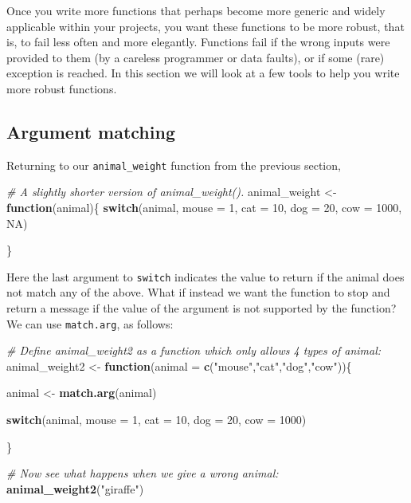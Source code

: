 \documentclass[]{book}
\newenvironment{Shaded}{\begin{snugshade}}{\end{snugshade}}
\newcommand{\CommentTok}[1]{\textcolor[rgb]{0.56,0.35,0.01}{\textit{#1}}}
\newcommand{\ControlFlowTok}[1]{\textcolor[rgb]{0.13,0.29,0.53}{\textbf{#1}}}
\newcommand{\DataTypeTok}[1]{\textcolor[rgb]{0.13,0.29,0.53}{#1}}
\newcommand{\DecValTok}[1]{\textcolor[rgb]{0.00,0.00,0.81}{#1}}
\newcommand{\KeywordTok}[1]{\textcolor[rgb]{0.13,0.29,0.53}{\textbf{#1}}}
\newcommand{\NormalTok}[1]{#1}
\newcommand{\OtherTok}[1]{\textcolor[rgb]{0.56,0.35,0.01}{#1}}
\newcommand{\StringTok}[1]{\textcolor[rgb]{0.31,0.60,0.02}{#1}}
\begin{document}
Once you write more functions that perhaps become more generic and widely applicable within your projects, you want these functions to be more robust, that is, to fail less often and more elegantly. Functions fail if the wrong inputs were provided to them (by a careless programmer or data faults), or if some (rare) exception is reached. In this section we will look at a few tools to help you write more robust functions.

\hypertarget{argument-matching}{%
\subsection{Argument matching}\label{argument-matching}}

Returning to our \texttt{animal\_weight} function from the previous section,

\begin{Shaded}
\begin{Highlighting}[]
\CommentTok{# A slightly shorter version of animal_weight().}
\NormalTok{animal_weight <-}\StringTok{ }\ControlFlowTok{function}\NormalTok{(animal)\{}
  \ControlFlowTok{switch}\NormalTok{(animal, }
             \DataTypeTok{mouse =} \DecValTok{1}\NormalTok{,}
             \DataTypeTok{cat =} \DecValTok{10}\NormalTok{,}
             \DataTypeTok{dog =} \DecValTok{20}\NormalTok{,}
             \DataTypeTok{cow =} \DecValTok{1000}\NormalTok{,}
             \OtherTok{NA}\NormalTok{)}
              
\NormalTok{\}}
\end{Highlighting}
\end{Shaded}

Here the last argument to \texttt{switch} indicates the value to return if the animal does not match any of the above. What if instead we want the function to stop and return a message if the value of the argument is not supported by the function? We can use \texttt{match.arg}, as follows:

\begin{Shaded}
\begin{Highlighting}[]
\CommentTok{# Define animal_weight2 as a function which only allows 4 types of animal:}
\NormalTok{animal_weight2 <-}\StringTok{ }\ControlFlowTok{function}\NormalTok{(}\DataTypeTok{animal =} \KeywordTok{c}\NormalTok{(}\StringTok{"mouse"}\NormalTok{,}\StringTok{"cat"}\NormalTok{,}\StringTok{"dog"}\NormalTok{,}\StringTok{"cow"}\NormalTok{))\{}
  
\NormalTok{  animal <-}\StringTok{ }\KeywordTok{match.arg}\NormalTok{(animal)}
  
  \ControlFlowTok{switch}\NormalTok{(animal, }
             \DataTypeTok{mouse =} \DecValTok{1}\NormalTok{,}
             \DataTypeTok{cat =} \DecValTok{10}\NormalTok{,}
             \DataTypeTok{dog =} \DecValTok{20}\NormalTok{,}
             \DataTypeTok{cow =} \DecValTok{1000}\NormalTok{)}
              
\NormalTok{\}}

\CommentTok{# Now see what happens when we give a wrong animal:}
\KeywordTok{animal_weight2}\NormalTok{(}\StringTok{"giraffe"}\NormalTok{)}
\end{Highlighting}
\end{Shaded}
\end{document}
